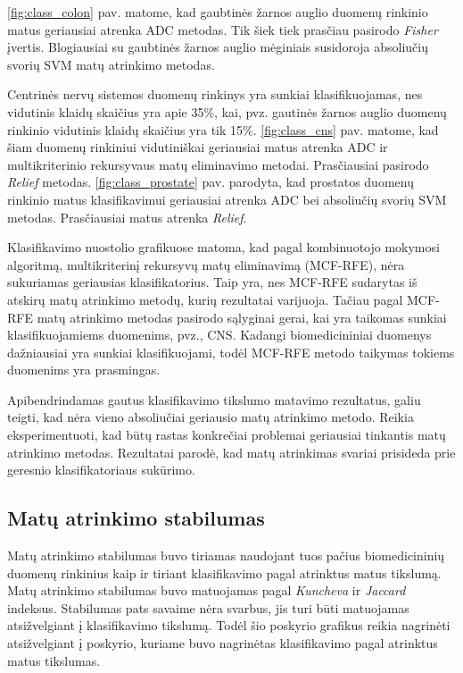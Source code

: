\ref{fig:class_colon} pav. matome, kad gaubtinės žarnos auglio duomenų rinkinio matus geriausiai atrenka ADC metodas. Tik šiek tiek prasčiau pasirodo \textit{Fisher} įvertis. Blogiausiai su gaubtinės žarnos auglio mėginiais susidoroja absoliučių svorių SVM matų atrinkimo metodas.

Centrinės nervų sistemos duomenų rinkinys yra sunkiai klasifikuojamas, nes vidutinis klaidų skaičius yra apie 35\%, kai, pvz. gautinės žarnos auglio duomenų rinkinio vidutinis klaidų skaičius yra tik 15\%. \ref{fig:class_cns} pav. matome, kad šiam duomenų rinkiniui vidutiniškai geriausiai matus atrenka ADC ir multikriterinio rekursyvaus matų eliminavimo metodai. Prasčiausiai pasirodo \textit{Relief} metodas.
\ref{fig:class_prostate} pav. parodyta, kad prostatos duomenų rinkinio matus klasifikavimui geriausiai atrenka ADC bei absoliučių svorių SVM metodas. Prasčiausiai matus atrenka \textit{Relief}.

Klasifikavimo nuostolio grafikuose matoma, kad pagal kombinuotojo mokymosi algoritmą, multikriterinį rekursyvų matų eliminavimą (MCF-RFE), nėra sukuriamas geriausias klasifikatorius. Taip yra, nes MCF-RFE sudarytas iš atskirų matų atrinkimo metodų, kurių rezultatai varijuoja. Tačiau pagal MCF-RFE matų atrinkimo metodas pasirodo sąlyginai gerai, kai yra taikomas sunkiai klasifikuojamiems duomenims, pvz., CNS. Kadangi biomedicininiai duomenys dažniausiai yra sunkiai klasifikuojami, todėl MCF-RFE metodo taikymas tokiems duomenims yra prasmingas.

Apibendrindamas gautus klasifikavimo tikslumo matavimo rezultatus, galiu teigti, kad nėra vieno absoliučiai geriausio matų atrinkimo metodo. Reikia eksperimentuoti, kad būtų rastas konkrečiai problemai geriausiai tinkantis matų atrinkimo metodas. Rezultatai parodė, kad matų atrinkimas svariai prisideda prie geresnio klasifikatoriaus sukūrimo.

\subsection{Matų atrinkimo stabilumas}

Matų atrinkimo stabilumas buvo tiriamas naudojant tuos pačius biomedicininių duomenų rinkinius kaip ir tiriant klasifikavimo pagal atrinktus matus tikslumą. Matų atrinkimo stabilumas buvo matuojamas pagal \textit{Kuncheva} ir \textit{Jaccard} indeksus. Stabilumas pats savaime nėra svarbus, jis turi būti matuojamas atsižvelgiant į klasifikavimo tikslumą. Todėl šio poskyrio grafikus reikia nagrinėti atsižvelgiant į poskyrio, kuriame buvo nagrinėtas klasifikavimo pagal atrinktus matus tikslumas.


